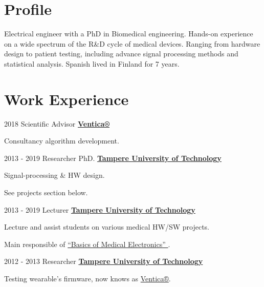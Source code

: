 \documentclass[letterpaper]{twentysecondcv} %
\begin{document}
\begin{RigthPage1}
\section{Profile}  
Electrical engineer with a PhD in Biomedical engineering. Hands-on experience on a wide spectrum of the R\&D cycle of medical devices. Ranging from hardware design to patient testing, including advance signal processing methods and statistical analysis. Spanish lived in Finland for 7 years.  
\\
\section{Work Experience}        
\begin{twenty}
	\twentyitemlist
    	{2018}
        {Scientific Advisor}
        {\href{https://www.ventica.net/}{\textbf{Ventica®}}} 
        {
          \item Consultancy algorithm development.
        }
        
	\twentyitemlist
    	{2013 - 2019}
        {Researcher PhD.}
        {\href{https://www.tut.fi/}{\textbf{Tampere University of Technology}}}
        {
          \item Signal-processing \& HW design.
          \item See projects section below.
        }
        
	\twentyitemlist
    	{2013 - 2019}
        {Lecturer}
        {\href{https://www.tut.fi/}{\textbf{Tampere University of Technology}}}
        {
        \item Lecture and assist students on various medical HW/SW projects.  
        \item Main responsible of 
\href{https://www.youtube.com/watch?time_continue=1&v=E3D8rAG6S4Q}{“Basics of Medical Electronics” }.
        }

	\twentyitemlist
    	{2012 - 2013}
        {Researcher}
        {\href{https://www.tut.fi/}{\textbf{Tampere University of Technology}}}
        {
        \item Testing wearable's firmware, now knows as \href{https://www.ventica.net/}{Ventica®}.   }


\end{twenty}
\end{RigthPage1}
\end{document}
